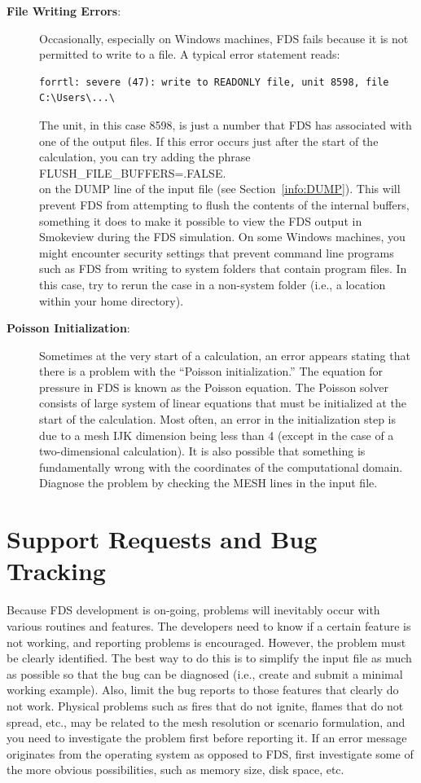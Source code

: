 \documentclass[11pt]{book}
\begin{document}
\begin{description}
\item[{\bf File Writing Errors}:]
Occasionally, especially on Windows machines, FDS fails because it is not permitted to write to a file. A typical error statement reads:
\begin{lstlisting}
forrtl: severe (47): write to READONLY file, unit 8598, file C:\Users\...\
\end{lstlisting}
The unit, in this case 8598, is just a number that FDS has associated with one of the output files. If this error occurs just after the start of
the calculation, you can try adding the phrase \\ {\ct FLUSH\_FILE\_BUFFERS=.FALSE.} \\ on the {\ct DUMP} line of the input file (see Section~\ref{info:DUMP}).
This will prevent FDS from attempting to flush the contents of the internal buffers, something it does to make it possible to view the FDS output
in Smokeview during the FDS simulation. On some Windows machines, you might encounter
security settings that prevent command line programs such as FDS from writing to system
folders that contain program files. In this case, try to rerun the case in a non-system folder
(i.e., a location within your home directory).

\item[{\bf Poisson Initialization}:]
Sometimes at the very start of a calculation, an error
appears stating that there is a problem with the ``Poisson initialization.'' The equation for
pressure in FDS is known as the Poisson equation. The Poisson solver consists of large system
of linear equations that must be initialized at the start of the calculation.
Most often, an error in the initialization step is due to a mesh {\ct IJK} dimension
being less than 4 (except in the case of a two-dimensional calculation). It is also possible that something is
fundamentally wrong with the coordinates of the computational domain. Diagnose the problem by
checking the {\ct MESH} lines in the input file.
\end{description}


\section{Support Requests and Bug Tracking}

Because FDS development is on-going, problems will inevitably occur
with various routines and features. The developers need to know if a certain
feature is not working, and reporting problems is encouraged. However, the
problem must be clearly identified. The best way to do this is to simplify
the input file as much as possible so that the bug can be diagnosed
(i.e., create and submit a minimal working example).
Also, limit the bug reports to those features that clearly do not work.
Physical problems such as fires that do not ignite, flames that do not
spread, etc., may be related to the mesh resolution or scenario
formulation, and you need to investigate the problem first before
reporting it. If an error message originates from the operating system as
opposed to FDS, first investigate some of the more obvious possibilities,
such as memory size, disk space, etc.
\end{document}
